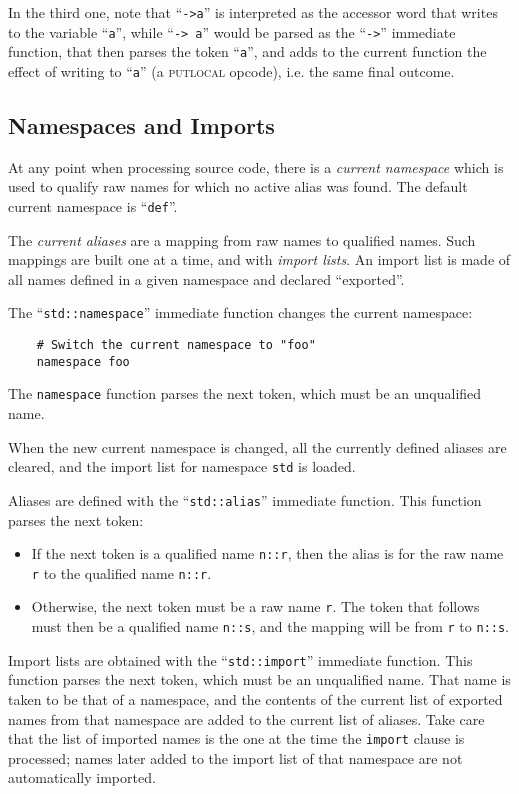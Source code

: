In the third one, note that ``\verb|->a|'' is interpreted as the
accessor word that writes to the variable ``\verb|a|'', while
``\verb|-> a|'' would be parsed as the ``\verb|->|'' immediate function,
that then parses the token ``\verb|a|'', and adds to the current
function the effect of writing to ``\verb|a|'' (a \textsc{putlocal}
opcode), i.e. the same final outcome.

\subsection{Namespaces and Imports}\label{syntax:namespace}

At any point when processing source code, there is a \emph{current
namespace} which is used to qualify raw names for which no active alias
was found. The default current namespace is ``\verb|def|''.

The \emph{current aliases} are a mapping from raw names to qualified
names. Such mappings are built one at a time, and with \emph{import
lists}. An import list is made of all names defined in a given namespace
and declared ``exported''.

The ``\verb|std::namespace|'' immediate function changes the current
namespace:
\begin{verbatim}
    # Switch the current namespace to "foo"
    namespace foo
\end{verbatim}
The \verb|namespace| function parses the next token, which must be an
unqualified name.

When the new current namespace is changed, all the currently defined
aliases are cleared, and the import list for namespace \verb|std| is
loaded.

Aliases are defined with the ``\verb|std::alias|'' immediate function.
This function parses the next token:
\begin{itemize}

    \item If the next token is a qualified name \verb|n::r|, then the
    alias is for the raw name \verb|r| to the qualified name \verb|n::r|.

    \item Otherwise, the next token must be a raw name \verb|r|. The
    token that follows must then be a qualified name \verb|n::s|, and
    the mapping will be from \verb|r| to \verb|n::s|.

\end{itemize}

Import lists are obtained with the ``\verb|std::import|'' immediate
function. This function parses the next token, which must be an
unqualified name. That name is taken to be that of a namespace, and the
contents of the current list of exported names from that namespace are
added to the current list of aliases. Take care that the list of
imported names is the one at the time the \verb|import| clause is
processed; names later added to the import list of that namespace are
not automatically imported.

